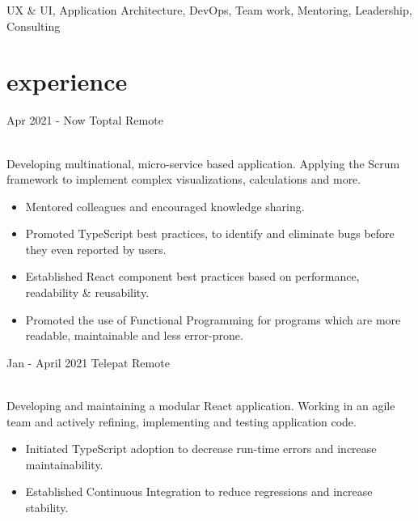 \documentclass[]{cv-style}          %
\begin{document}
UX \& UI, Application Architecture, DevOps, Team work, Mentoring, Leadership, Consulting


\section{experience}

\begin{entrylist}
  \entry
  {Apr 2021 - Now}
  {Toptal}
  {Remote}
  {\\
    Developing multinational, micro-service based application. Applying the Scrum framework to implement complex visualizations, calculations and more. \\
    \subtitle{Detailed achievements:}
    \begin{itemize}
      \item Mentored colleagues and encouraged knowledge sharing.
      \item Promoted TypeScript best practices, to identify and eliminate bugs before they even reported by users.
      \item Established React component best practices based on performance, readability \& reusability.
      \item Promoted the use of Functional Programming for programs which are more readable, maintainable and less error-prone.
    \end{itemize}}
  \entry
  {Jan - April 2021}
  {Telepat}
  {Remote}
  {\\
    Developing and maintaining a modular React application. Working in an agile team and actively refining, implementing and testing application code. \\
    \subtitle{Detailed achievements:}
    \begin{itemize}
      \item Initiated TypeScript adoption to decrease run-time errors and increase maintainability.
      \item Established Continuous Integration to reduce regressions and increase stability.
    \end{itemize}}

\end{entrylist}
\end{document}
